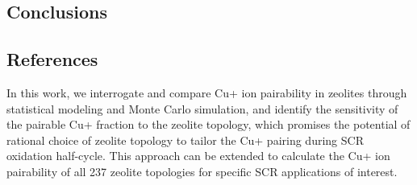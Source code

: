 \documentclass[12pt]{article}
\begin{document}
\subsection*{Conclusions}


\subsection*{References}

In this work, we interrogate and compare Cu+ ion pairability in zeolites through statistical modeling and Monte Carlo simulation, and identify the sensitivity of the pairable Cu+ fraction to the zeolite topology, which promises the potential of rational choice of zeolite topology to tailor the Cu+ pairing during SCR oxidation half-cycle. This approach can be extended to calculate the Cu+ ion pairability of all 237 zeolite topologies for specific SCR applications of interest. 
\end{document}
